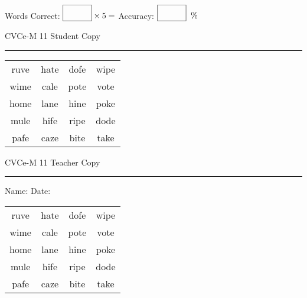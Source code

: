 \documentclass{memoir}
\begin{document}
\small

Words Correct: $\fbox{\phantom{\huge 100}} \times 5 = $ Accuracy: $\fbox{\phantom{\huge 100}}\;\; \%$ 

\vfill

\newpage


\footnotesize \noindent
CVCe-M 11 \hfill Student Copy
\smallskip
\hrule

\Large

\setlength{\tabcolsep}{14pt}
\def\arraystretch{2}

{\selectfont


\begin{vplace}[0.5]
\begin{center}
\begin{tabular}{cccc}
ruve & hate & dofe & wipe \\
wime & cale & pote & vote \\
home & lane & hine & poke \\
mule & hife & ripe & dode \\
pafe & caze & bite & take \\
\end{tabular}
\end{center}
\end{vplace}

}

\newpage

\footnotesize \noindent
CVCe-M 11 \hfill Teacher Copy
\smallskip
\hrule

\small

\vfill

\noindent
Name: \underline{\hspace{1.75in}} \hfill Date: \underline{\hspace{1in}}

\Large

{\selectfont


\begin{vplace}[0.5]
\begin{center}
\begin{tabular}{cccc}
ruve & hate & dofe & wipe \\
wime & cale & pote & vote \\
home & lane & hine & poke \\
mule & hife & ripe & dode \\
pafe & caze & bite & take \\
\end{tabular}
\end{center}
\end{vplace}



}
\end{document}
